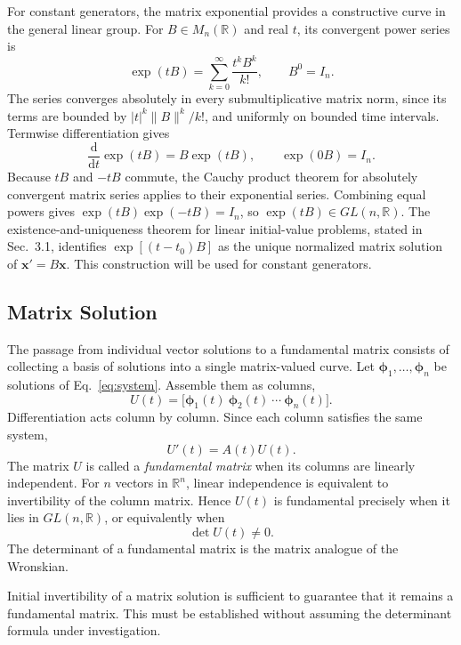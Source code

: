 \documentclass[11pt,a4paper]{article}
\newcommand{\be}{\begin{equation}}
\newcommand{\ee}{\end{equation}}
\newcommand{\lb}[1]{\label{#1}}
\newcommand{\dd}{\mathrm{d}}
\newcommand{\R}{\mathbb{R}}
\theoremstyle{definition}
\numberwithin{equation}{section}
\begin{document}
For constant generators, the matrix exponential provides a constructive curve in the general linear group. For $B\in M_n(\R)$ and real $t$, its convergent power series is
\be
\exp(tB)=\sum_{k=0}^{\infty}\frac{t^kB^k}{k!},\qquad B^0=I_n.
\lb{eq:matrix-exp-series}
\ee
The series converges absolutely in every submultiplicative matrix norm, since its terms are bounded by $|t|^k\|B\|^k/k!$, and uniformly on bounded time intervals. Termwise differentiation gives
\be
\frac{\dd}{\dd t}\exp(tB)=B\exp(tB),\qquad \exp(0B)=I_n.
\lb{eq:matrix-exp-derivative}
\ee
Because $tB$ and $-tB$ commute, the Cauchy product theorem for absolutely convergent matrix series applies to their exponential series. Combining equal powers gives $\exp(tB)\exp(-tB)=I_n$, so $\exp(tB)\in GL(n,\R)$. The existence-and-uniqueness theorem for linear initial-value problems, stated in Sec.~3.1, identifies $\exp[(t-t_0)B]$ as the unique normalized matrix solution of $\mathbf x'=B\mathbf x$. This construction will be used for constant generators.

\subsection{Matrix Solution}

The passage from individual vector solutions to a fundamental matrix consists of collecting a basis of solutions into a single matrix-valued curve. Let $\boldsymbol{\phi}_1,\ldots,\boldsymbol{\phi}_n$ be solutions of Eq.~\eqref{eq:system}. Assemble them as columns,
\be
U(t)=
\bigl[
\boldsymbol{\phi}_1(t)\ 
\boldsymbol{\phi}_2(t)\ 
\cdots\ 
\boldsymbol{\phi}_n(t)
\bigr].
\lb{eq:column-matrix}
\ee
Differentiation acts column by column. Since each column satisfies the same system,
\be
U'(t)=A(t)U(t).
\lb{eq:matrix-solution}
\ee
The matrix $U$ is called a \emph{fundamental matrix} when its columns are linearly independent. For $n$ vectors in $\R^n$, linear independence is equivalent to invertibility of the column matrix. Hence $U(t)$ is fundamental precisely when it lies in $GL(n,\R)$, or equivalently when
\be
\det U(t)\neq0.
\lb{eq:fundamental-det}
\ee
The determinant of a fundamental matrix is the matrix analogue of the Wronskian.

Initial invertibility of a matrix solution is sufficient to guarantee that it remains a fundamental matrix. This must be established without assuming the determinant formula under investigation.
\end{document}
